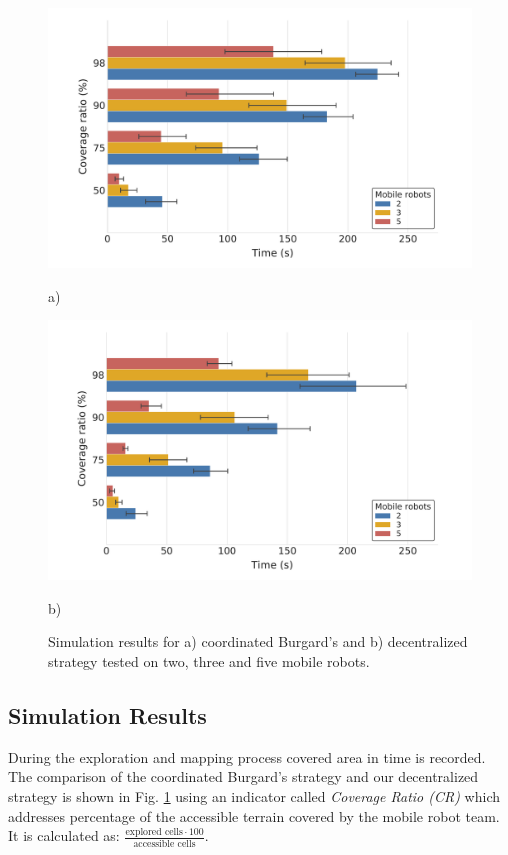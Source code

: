 \begin{figure}[t]
    \centering
	\begin{minipage}{1.0\columnwidth}
	   \centering
	   \includegraphics[width=\columnwidth]{./Pictures/burgard_results.pdf}
	   \caption*{a)} 
	\end{minipage}
\hfill 	
	\begin{minipage}{1.0\columnwidth}
	   \centering
	   \includegraphics[width=\columnwidth]{./Pictures/decent_results.pdf}
	   \caption*{b)} 
	\end{minipage}
\caption{Simulation results for a) coordinated Burgard's and b) decentralized strategy tested on two, three and five mobile robots.}
\label{fig:results}
\end{figure}


\subsection{Simulation Results}

During the exploration and mapping process covered area in time is recorded. The comparison of the coordinated Burgard's strategy and our decentralized strategy is shown in Fig. \ref{fig:results} using an indicator called \textit{Coverage Ratio (CR)} which addresses percentage of the accessible terrain covered by the mobile robot team. It is calculated as:  \( \frac{\text{explored cells} \cdot 100}{\text{accessible cells}} \).

